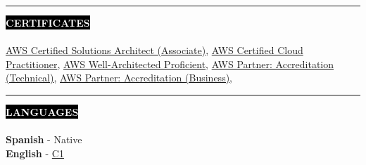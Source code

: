 \documentclass[10pt,A4]{article}
\newcounter{a}
\newcounter{b}
\newcounter{c}
\newcommand{\cvsection}[1] {
	\textcolor{white}{\MakeUppercase{\textbf{#1}}}
}
\newcommand{\cvsect}[1]{
	\colorbox{black}{{\cvsection{#1}}}\\\\%
}
\begin{document}
	
	\begin{minipage}[t]{0.7\textwidth}\hrule height 0pt width 0pt%
		\cvsect{Certificates}
		\href{https://www.credly.com/badges/dbb4510d-c80e-4bdf-bf9b-52e370013a9a}{AWS Certified Solutions Architect (Associate)}, 
		\href{https://www.credly.com/badges/4f129c39-edb2-410c-91aa-d8bf8617706f}{AWS Certified Cloud Practitioner}, 
		\href{https://www.credly.com/badges/1e0ac89f-4e38-4e91-93aa-3a62e7c33709}{AWS Well-Architected Proficient}, 
		\href{https://www.credly.com/badges/4f7bb440-1f63-4b79-a7b1-116f16da0656}{AWS Partner: Accreditation (Technical)}, 
		\href{https://www.credly.com/badges/c35e5c25-1938-4810-9489-1871644d7175}{AWS Partner: Accreditation (Business)}, 
	\end{minipage}%
	\hspace{2.6cm}
	\begin{minipage}[t]{0.3\textwidth}\hrule height 0pt width 0pt%
		\cvsect{Languages}
		\textbf{Spanish} - Native\\
		\textbf{English} - \href{https://cert.efset.org/hqaFfD}{C1}\\
	\end{minipage}%
	\hfill
	\vspace{1cm}

	
\end{document}
